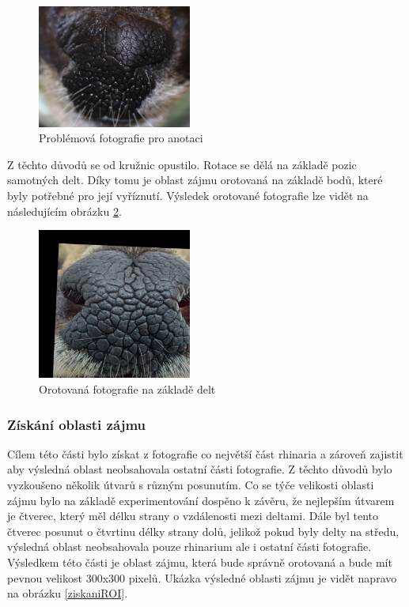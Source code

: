 \begin{figure}[h]
	\centering
	\includegraphics[width=0.45\textwidth]{obrazky/dirka_problem.JPG}
	\caption{Problémová fotografie pro anotaci}
	\label{anotace_problem}
\end{figure} 

Z těchto důvodů se od kružnic opustilo. Rotace se dělá na základě pozic samotných delt. Díky tomu je oblast zájmu orotovaná na základě bodů, které byly potřebné pro její vyříznutí. Výsledek orotované fotografie lze vidět na následujícím obrázku \ref{rotated}.


\begin{figure}[h]
	\centering
	\includegraphics[width=0.45\textwidth]{obrazky/2_rotated.png}
	\caption{Orotovaná fotografie na základě delt}
	\label{rotated}
\end{figure} 

\subsubsection{Získání oblasti zájmu}

Cílem této části bylo získat z fotografie co největší část rhinaria a zároveň zajistit aby výsledná oblast neobsahovala ostatní části fotografie. Z těchto důvodů bylo vyzkoušeno několik útvarů s různým posunutím. Co se týče velikosti oblasti zájmu bylo na základě experimentování dospěno k závěru, že nejlepším útvarem je čtverec, který měl délku strany o vzdálenosti mezi deltami. Dále byl tento čtverec posunut o čtvrtinu délky strany dolů, jelikož pokud byly delty na středu, výsledná oblast neobsahovala pouze rhinarium ale i ostatní části fotografie. Výsledkem této části je oblast zájmu, která bude správně orotovaná a bude mít pevnou velikost 300x300 pixelů. Ukázka výsledné oblasti zájmu je vidět napravo na obrázku \ref{ziskaniROI}.


